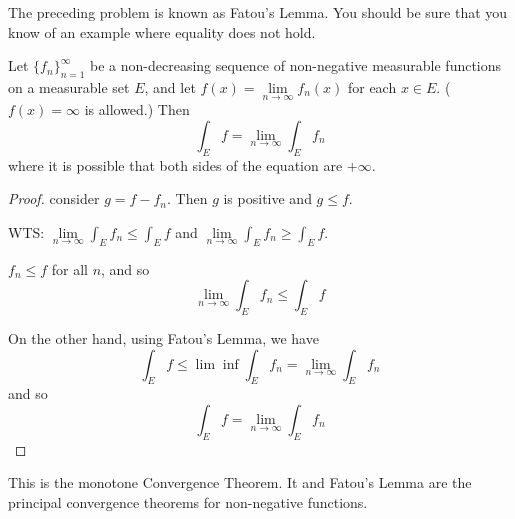 \begin{rmk}%
	The preceding problem is known as Fatou's Lemma. You should be sure that you know of an 
	example where equality does not hold. 
\end{rmk}

\begin{pblm}\label{p:mct}%
	Let $\{f_n\}_{n=1}^\infty$ be a non-decreasing sequence of non-negative measurable functions 
	on a measurable set $E$, and let $f(x) = \lim\limits_{n\to\infty}f_n(x)$ for each $x \in E$. 
	($f(x) = \infty$ is allowed.) Then 
	\begin{equation*}
		\int_E f = \lim\limits_{n\to\infty}\int_Ef_n 
	\end{equation*}
	where it is possible that both sides of the equation are $+\infty$. 
\begin{proof}
	consider $g = f - f_n$. Then $g$ is positive and $ g \le f$. 

	WTS:
	$\lim\limits_{n\to\infty}\int_E f_n \le \int_E f$ and $\lim\limits_{n\to\infty}\int_E f_n \ge \int_E f$. 

	$f_n \le f$ for all $n$, and so 
	\begin{equation*}
		\lim\limits_{n\to\infty}\int_E f_n \le \int_E f
	\end{equation*}

	On the other hand, using Fatou's Lemma, we have 
	\begin{equation*}
		\int_E f \le \lim\inf \int_E f_n = \lim\limits_{n\to\infty} \int_E f_n
	\end{equation*}
	and so 
	\begin{equation*}
		\int_E f = \lim\limits_{n\to\infty}\int_E f_n
	\end{equation*}
\end{proof}
\end{pblm}

\begin{rmk}%
	This is the monotone Convergence Theorem. It and Fatou's Lemma are the principal convergence 
	theorems for non-negative functions. 
\end{rmk}


